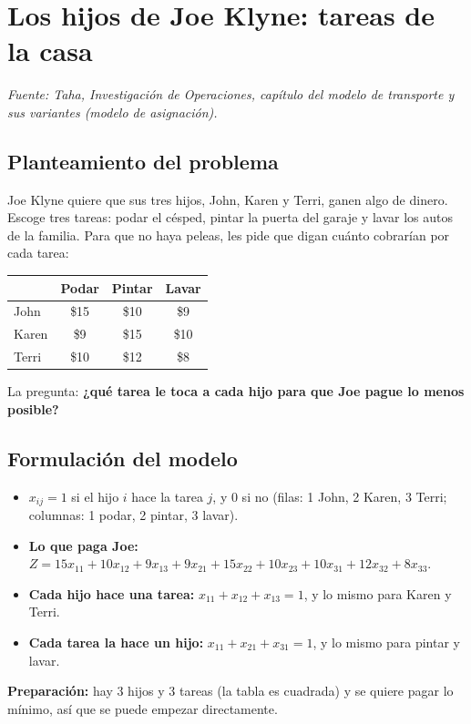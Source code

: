 \documentclass[11pt,a4paper]{article}
\begin{document}
\section{Los hijos de Joe Klyne: tareas de la casa}
\textit{Fuente: Taha, Investigación de Operaciones, capítulo del modelo de transporte y sus variantes (modelo de asignación).}

\subsection*{Planteamiento del problema}
Joe Klyne quiere que sus tres hijos, John, Karen y Terri, ganen algo de dinero. Escoge tres tareas: podar el
césped, pintar la puerta del garaje y lavar los autos de la familia. Para que no haya peleas, les pide que digan
cuánto cobrarían por cada tarea:

\begin{center}\small
\begin{tabular}{lccc}
\toprule
 & \textbf{Podar} & \textbf{Pintar} & \textbf{Lavar} \\
\midrule
John  & \$15 & \$10 & \$9 \\
Karen & \$9  & \$15 & \$10 \\
Terri & \$10 & \$12 & \$8 \\
\bottomrule
\end{tabular}
\end{center}

La pregunta: \textbf{¿qué tarea le toca a cada hijo para que Joe pague lo menos posible?}

\subsection*{Formulación del modelo}
\begin{itemize}[itemsep=2pt]
  \item $x_{ij} = 1$ si el hijo $i$ hace la tarea $j$, y $0$ si no (filas: 1 John, 2 Karen, 3 Terri; columnas:
        1 podar, 2 pintar, 3 lavar).
  \item \textbf{Lo que paga Joe:} $Z = 15x_{11} + 10x_{12} + 9x_{13} + 9x_{21} + 15x_{22} + 10x_{23} + 10x_{31} + 12x_{32} + 8x_{33}$.
  \item \textbf{Cada hijo hace una tarea:} $x_{11} + x_{12} + x_{13} = 1$, y lo mismo para Karen y Terri.
  \item \textbf{Cada tarea la hace un hijo:} $x_{11} + x_{21} + x_{31} = 1$, y lo mismo para pintar y lavar.
\end{itemize}
\textbf{Preparación:} hay 3 hijos y 3 tareas (la tabla es cuadrada) y se quiere pagar lo mínimo, así que se puede
empezar directamente.
\end{document}
